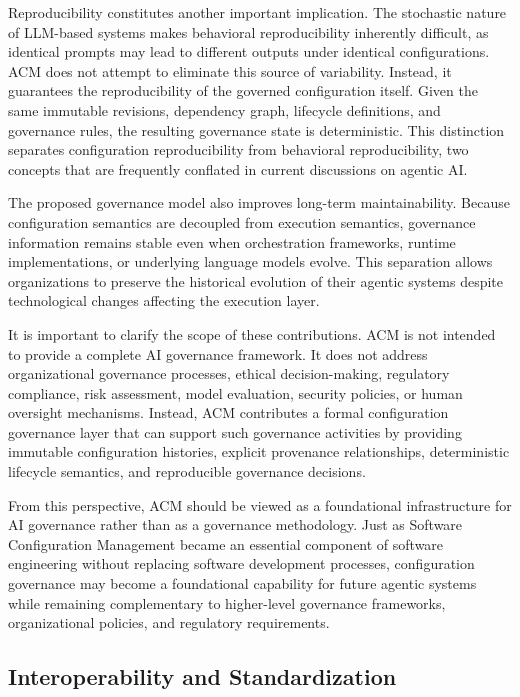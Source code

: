 \documentclass[10pt]{article}
\begin{document}
Reproducibility constitutes another important implication. The stochastic nature of LLM-based systems makes behavioral reproducibility inherently difficult, as identical prompts may lead to different outputs under identical configurations. ACM does not attempt to eliminate this source of variability. Instead, it guarantees the reproducibility of the governed configuration itself. Given the same immutable revisions, dependency graph, lifecycle definitions, and governance rules, the resulting governance state is deterministic. This distinction separates configuration reproducibility from behavioral reproducibility, two concepts that are frequently conflated in current discussions on agentic AI.

The proposed governance model also improves long-term maintainability. Because configuration semantics are decoupled from execution semantics, governance information remains stable even when orchestration frameworks, runtime implementations, or underlying language models evolve. This separation allows organizations to preserve the historical evolution of their agentic systems despite technological changes affecting the execution layer.

It is important to clarify the scope of these contributions. ACM is not intended to provide a complete AI governance framework. It does not address organizational governance processes, ethical decision-making, regulatory compliance, risk assessment, model evaluation, security policies, or human oversight mechanisms. Instead, ACM contributes a formal configuration governance layer that can support such governance activities by providing immutable configuration histories, explicit provenance relationships, deterministic lifecycle semantics, and reproducible governance decisions.

From this perspective, ACM should be viewed as a foundational infrastructure for AI governance rather than as a governance methodology. Just as Software Configuration Management became an essential component of software engineering without replacing software development processes, configuration governance may become a foundational capability for future agentic systems while remaining complementary to higher-level governance frameworks, organizational policies, and regulatory requirements.

\subsection{Interoperability and Standardization}
\end{document}

